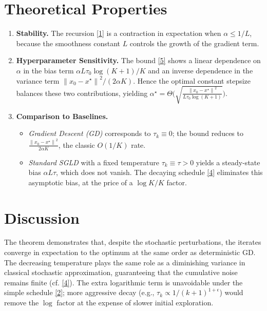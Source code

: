\documentclass{article}
\newcommand{\norm}[1]{\left\|#1\right\|}
\begin{document}
\section*{Theoretical Properties}
\begin{enumerate}[label=\arabic*.]
\item \textbf{Stability.} The recursion \eqref{1} is a contraction in expectation when $\alpha\le 1/L$, because the smoothness constant $L$ controls the growth of the gradient term.
\item \textbf{Hyperparameter Sensitivity.} The bound \eqref{5} shows a linear dependence on $\alpha$ in the bias term $\alpha L\tau_0\log(K+1)/K$ and an inverse dependence in the variance term $\norm{x_0-x^\star}^2/(2\alpha K)$. Hence the optimal constant stepsize balances these two contributions, yielding $\alpha^\star =\Theta\!\bigl(\sqrt{\frac{\norm{x_0-x^\star}^2}{L\tau_0\log(K+1)}}\bigr)$.
\item \textbf{Comparison to Baselines.}
    \begin{itemize}
        \item \emph{Gradient Descent (GD)} corresponds to $\tau_k\equiv0$; the bound reduces to $\frac{\norm{x_0-x^\star}^2}{2\alpha K}$, the classic $O(1/K)$ rate.
        \item \emph{Standard SGLD} with a fixed temperature $\tau_k\equiv\tau>0$ yields a steady-state bias $\alpha L\tau$, which does not vanish. The decaying schedule \eqref{4} eliminates this asymptotic bias, at the price of a $\log K/K$ factor.
    \end{itemize}
\end{enumerate}

\section*{Discussion}
The theorem demonstrates that, despite the stochastic perturbations, the iterates converge in expectation to the optimum at the same order as deterministic GD. The decreasing temperature plays the same role as a diminishing variance in classical stochastic approximation, guaranteeing that the cumulative noise remains finite (cf. \eqref{4}). The extra logarithmic term is unavoidable under the simple schedule \eqref{2}; more aggressive decay (e.g., $\tau_k\propto 1/(k+1)^{1+\epsilon}$) would remove the $\log$ factor at the expense of slower initial exploration.
\end{document}
